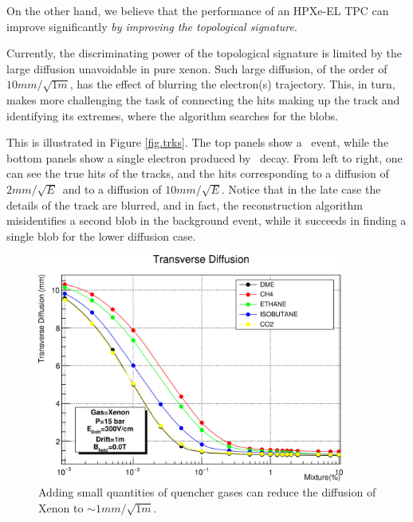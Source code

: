 On the other hand, we believe that the performance of an HPXe-EL TPC can improve significantly {\em by improving the topological signature}. 

Currently, the discriminating power of the topological signature is limited by the large diffusion unavoidable in pure xenon. Such large diffusion, of the order of $10 mm/\sqrt{1 m}$, has the effect of blurring the electron(s) trajectory. This, in turn, makes more challenging the task of connecting the hits making up the track and identifying its extremes, where the algorithm searches for the blobs. 

This is illustrated in Figure \ref{fig.trks}. The top panels show a \bbonu\ event, while the bottom panels show a single electron produced by \BI\ decay. From left to right, one can see the true hits of the tracks, and the hits corresponding to a diffusion of $2 mm/\sqrt{E}$~and to a diffusion of
$10 mm/\sqrt{E}$. Notice that in the late case the details of the track are blurred, and in fact, the reconstruction algorithm misidentifies a second blob in the background event, while it succeeds in finding a single blob for the lower diffusion case. 

\begin{figure}
\centering
\includegraphics[width=0.90\textwidth]{img2/TD300V.jpg}
\caption{\small Adding small quantities of quencher gases can reduce the diffusion of Xenon to $\sim 1 mm/\sqrt{1 m}$.} \label{fig.QG}
\end{figure}



